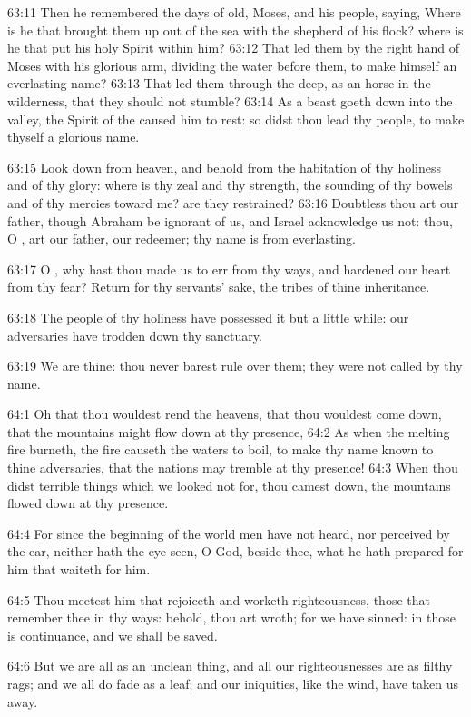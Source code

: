 63:11 Then he remembered the days of old, Moses, and his people, saying, Where is he that brought them up out of the sea with the shepherd of his flock? where is he that put his holy Spirit within him?  63:12 That led them by the right hand of Moses with his glorious arm, dividing the water before them, to make himself an everlasting name?  63:13 That led them through the deep, as an horse in the wilderness, that they should not stumble?  63:14 As a beast goeth down into the valley, the Spirit of the \LORD caused him to rest: so didst thou lead thy people, to make thyself a glorious name.

63:15 Look down from heaven, and behold from the habitation of thy holiness and of thy glory: where is thy zeal and thy strength, the sounding of thy bowels and of thy mercies toward me? are they restrained?  63:16 Doubtless thou art our father, though Abraham be ignorant of us, and Israel acknowledge us not: thou, O \LORD, art our father, our redeemer; thy name is from everlasting.

63:17 O \LORD, why hast thou made us to err from thy ways, and hardened our heart from thy fear? Return for thy servants' sake, the tribes of thine inheritance.

63:18 The people of thy holiness have possessed it but a little while: our adversaries have trodden down thy sanctuary.

63:19 We are thine: thou never barest rule over them; they were not called by thy name.

64:1 Oh that thou wouldest rend the heavens, that thou wouldest come down, that the mountains might flow down at thy presence, 64:2 As when the melting fire burneth, the fire causeth the waters to boil, to make thy name known to thine adversaries, that the nations may tremble at thy presence!  64:3 When thou didst terrible things which we looked not for, thou camest down, the mountains flowed down at thy presence.

64:4 For since the beginning of the world men have not heard, nor perceived by the ear, neither hath the eye seen, O God, beside thee, what he hath prepared for him that waiteth for him.

64:5 Thou meetest him that rejoiceth and worketh righteousness, those that remember thee in thy ways: behold, thou art wroth; for we have sinned: in those is continuance, and we shall be saved.

64:6 But we are all as an unclean thing, and all our righteousnesses are as filthy rags; and we all do fade as a leaf; and our iniquities, like the wind, have taken us away.


